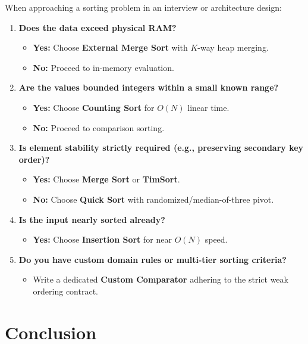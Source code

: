 \documentclass[10pt,journal,compsoc,onecolumn]{IEEEtran}
\begin{document}
When approaching a sorting problem in an interview or architecture design:
\begin{enumerate}
    \item \textbf{Does the data exceed physical RAM?}
    \begin{itemize}
        \item \textbf{Yes:} Choose \textbf{External Merge Sort} with $K$-way heap merging.
        \item \textbf{No:} Proceed to in-memory evaluation.
    \end{itemize}
    \item \textbf{Are the values bounded integers within a small known range?}
    \begin{itemize}
        \item \textbf{Yes:} Choose \textbf{Counting Sort} for $O(N)$ linear time.
        \item \textbf{No:} Proceed to comparison sorting.
    \end{itemize}
    \item \textbf{Is element stability strictly required (e.g., preserving secondary key order)?}
    \begin{itemize}
        \item \textbf{Yes:} Choose \textbf{Merge Sort} or \textbf{TimSort}.
        \item \textbf{No:} Choose \textbf{Quick Sort} with randomized/median-of-three pivot.
    \end{itemize}
    \item \textbf{Is the input nearly sorted already?}
    \begin{itemize}
        \item \textbf{Yes:} Choose \textbf{Insertion Sort} for near $O(N)$ speed.
    \end{itemize}
    \item \textbf{Do you have custom domain rules or multi-tier sorting criteria?}
    \begin{itemize}
        \item Write a dedicated \textbf{Custom Comparator} adhering to the strict weak ordering contract.
    \end{itemize}
\end{enumerate}

\section{Conclusion}
\label{sec:conclusion}
\end{document}
